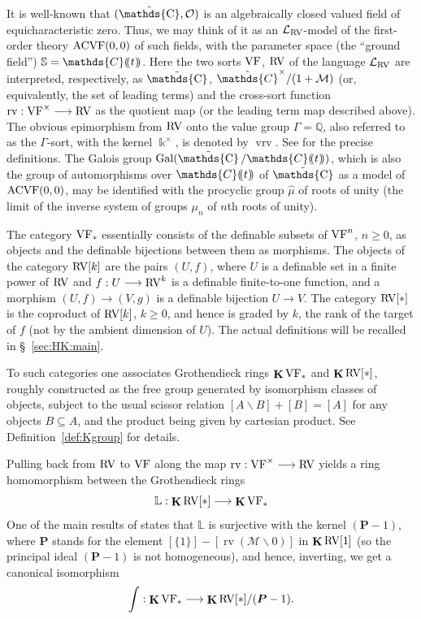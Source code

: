 \documentclass[12pt]{amsart}
\theoremstyle{plain}
\theoremstyle{definition}
\theoremstyle{remark}
\numberwithin{equation}{section}
\theoremstyle{plain}
\newcommand{\VF}{\textup{VF}}
\newcommand{\ACVF}{\textup{ACVF}}
\newcommand{\RV}{\textup{RV}}
\newcommand{\MM}{\mdl M}
\newcommand{\OO}{\mdl O}
\DeclareMathOperator{\K}{\mathds{k}}
\newcommand{\C}{\mathds{C}}
\newcommand{\Q}{\mathds{Q}}
\newcommand{\0}{\emptyset}
\newcommand{\dpar}[1]{%
   (\mkern-4mu (#1 )\mkern-4mu )}
\newcommand{\lan}[3]{\mathcal{L}_{#1 \textup{#2} #3}}
\newcommand{\mdl}[1]{\mathcal{#1}}  %
\newcommand{\bb}[1]{\mathbb{#1}}
\newcommand{\fun}{\longrightarrow}
\newcommand{\sub}{\subseteq}
\newcommand{\mi}{\smallsetminus}
\DeclareMathOperator{\rv}{rv}
\DeclareMathOperator{\ggk}{\mathbf{K}}
\DeclareMathOperator{\vrv}{vrv}
\DeclareMathOperator{\gal}{Gal}
\DeclareMathOperator{\puC}{\tilde \C}
\begin{document}
It is well-known that $(\puC, \OO)$ is an algebraically closed valued field of equicharacteristic zero. Thus, we may  think of it as an $\lan{}{RV}{}$-model of the first-order theory $\ACVF(0,0)$ of such fields, with the parameter space (the ``ground field'') $\bb S = \C \dpar t$.  Here  the two sorts $\VF$, $\RV$ of the language $\lan{}{RV}{}$ are  interpreted, respectively, as $\puC$, $\tilde \C^\times / (1 + \MM)$ (or, equivalently, the set of leading terms) and the cross-sort function $\rv : \VF^\times \fun \RV$ as the quotient map (or the leading term map described above). The obvious epimorphism from $\RV$ onto the value group $\Gamma = \Q$, also referred to as the $\Gamma$-sort, with the kernel $\K^\times$, is denoted by $\vrv$. See \cite[\S~2]{Yin:special:trans} for the precise definitions. The Galois group $\gal(\puC / \C \dpar t)$, which  is also the group of automorphisms over $\C \dpar t$ of $\puC$ as a model of $\ACVF(0,0)$, may be identified with the procyclic group $\hat \mu$ of roots of unity (the limit of the inverse system of groups $\mu_n$ of $n$th roots of unity).


The category $\VF_*$ essentially consists of the definable subsets of $\VF^n$, $n \geq 0$, as objects and the definable bijections between them as morphisms. The objects of the category $\RV[k]$ are the pairs $(U, f)$, where $U$ is a definable set in a finite power of $\RV$ and $f : U \fun \RV^k$ is a definable finite-to-one function, and a morphism $(U, f) \fun (V, g)$ is a definable bijection $U \fun V$. The category  $\RV[*]$  is the coproduct of $\RV[k]$, $k \geq 0$, and hence is graded by $k$, the rank of the target of $f$ (not by the ambient dimension of $U$). The actual definitions will be recalled in \S~\ref{sec:HK:main}.


To such categories one associates Grothendieck rings $\ggk\VF_*$ and $\ggk\RV[*]$, roughly constructed as the free group generated by isomorphism classes of objects, subject to the usual scissor relation $[A \mi B] + [B] = [A]$ for any objects $B \sub A$, and the product being given by cartesian product. See  Definition~\ref{def:Kgroup} for details.


Pulling back from $\RV$ to $\VF$ along the map $\rv: \VF^\times \fun \RV$ yields a ring homomorphism between the   Grothendieck rings
\begin{equation}\label{lifting:hom}
\bb L : \ggk\RV[*] \fun \ggk\VF_*
\end{equation}
One of the  main results of \cite{hrushovski:kazhdan:integration:vf} states that $\bb L$ is surjective with the kernel $(\bm P-1)$, where $\bm P$ stands for the element $[\{1\}] - [\rv(\MM \mi 0)]$  in $\ggk \RV[1]$ (so the principal ideal $(\bm P - 1)$ is not homogeneous), and hence, inverting, we get a canonical isomorphism
\[
\int : \ggk\VF_* \fun \ggk\RV[*]/(\bm P-1).
\]
\end{document}

